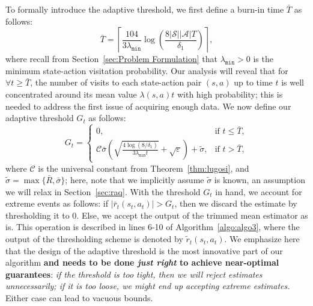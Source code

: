 \documentclass{article}
\begin{document}
To formally introduce the adaptive threshold, we first define a burn-in time $\bar{T}$ as follows: 
\begin{equation}\label{eqn:Tbar}
\bar{T} = \left\lceil \frac{104}{3 \lambda_{\texttt{min}}} \log\left( \frac{8 |\mathcal{S}||\mathcal{A}| T}{\delta_1} \right) \right\rceil, 
\end{equation}
where recall from Section~\ref{sec:Problem Formulation} that $\lambda_{\texttt{min}} >0$ is the minimum state-action visitation probability. Our analysis will reveal that for $\forall t \geq \bar{T}$, the number of visits to each state-action pair $(s,a)$ up to time $t$ is well concentrated around its mean value $\lambda(s,a) t$ with high probability; this is needed to address the first issue of acquiring enough data. We now define our adaptive threshold $G_t$ as follows: 
\begin{equation}\label{eqn:Gt}
G_t = 
\begin{cases}
0, & \text{if } t \leq \bar{T}, \\
\mathcal{C} \bar{\sigma} \left( \sqrt{ \frac{4 \log(8/\delta_1)}{3 \lambda_{\texttt{min}} t} } + \sqrt{\varepsilon} \right) + \tilde{\sigma}, & \text{if } t > \bar{T},
\end{cases}
\end{equation}
where \( \mathcal{C} \) is the universal constant from Theorem~\ref{thm:lugosi}, and \( \tilde{\sigma} = \max\{ \bar{R}, \bar{\sigma} \} \); here, note that we implicitly assume $\tilde{\sigma}$ is known, an assumption we will relax in Section~\ref{sec:raq}. With the threshold $G_t$ in hand, we account for extreme events as follows: if $|\bar{r}_t(s_t,a_t)| > G_t$, then we discard the estimate by thresholding it to $0$. Else, we accept the output of the trimmed mean estimator as is. This operation is described in lines 6-10 of Algorithm~\ref{algo:algo3}, where the output of the thresholding scheme is denoted by $\tilde{r}_t(s_t, a_t)$. We emphasize here that the design of the adaptive threshold is the most innovative part of our algorithm \textbf{and needs to be done \emph{just right} to achieve near-optimal guarantees}: \emph{if the threshold is too tight, then we will reject estimates unnecessarily; if it is too loose, we might end up accepting extreme estimates.} Either case can lead to vacuous bounds. 
\end{document}
